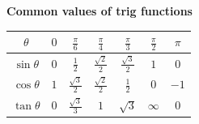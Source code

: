 \documentclass[12pt]{article}
\begin{document}
\begin{center}
{{{\begin{minipage}[t][1.03\height][c]
		\centering \textbf{Common values of trig functions}\\ \vspace{2mm}
	
		\renewcommand{\arraystretch}{1.6} \hspace{.5mm}
		\begin{tabular}{|c|c|c|c|c|c|c|}
    		\hline
    		\hspace{1mm} $\theta$ \hspace{1mm} & \hspace{1.5mm}$0$\hspace{1.5mm} &\hspace{1mm} $\tfrac {\pi}{6}$\hspace{2mm} &\hspace{1mm} $\tfrac {\pi}{4}$ \hspace{1mm} &\hspace{1mm} $\tfrac {\pi}{3}$ \hspace{1mm} & \hspace{1.5mm} $\tfrac {\pi}{2}$ \hspace{2mm} &\hspace{1mm} $\pi$\hspace{2mm} \\ \hline
    			$\sin \theta$ & $0$ & $\tfrac {1}{2}$ & $\tfrac {\sqrt{2}}{2}$ & $\tfrac {\sqrt{3}}{2}$ & $1$ & $0$\\ \hline
    			$\cos \theta$ & $1$ & $\tfrac {\sqrt{3}}{2}$ & $\tfrac {\sqrt{2}}{2}$ & $\tfrac {1}{2}$ & $0$ & $-1$ \\ \hline
    			$\tan \theta$ & $0$ & $\tfrac {\sqrt{3}}{3}$ & $1$ & $\sqrt{3}$ & $\infty$ & $0$ \\ \hline
    
    	\end{tabular}
    	\vspace{1mm}
	\end{minipage}} \\ \vspace{1mm}
	\noindent{}
	\noindent{}\\ \vspace{1mm}

}}
\end{center}
\end{document}
